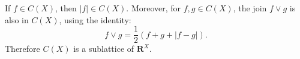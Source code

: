 If $f \in C(X)$, then $|f| \in C(X)$. Moreover, for $f, g \in C(X)$, the join $f \vee g$ is also in $C(X)$, using the identity:
$$f \vee g = \frac{1}{2}(f + g + |f - g|).$$
Therefore $C(X)$ is a sublattice of $\mathbf{R}^X$.
